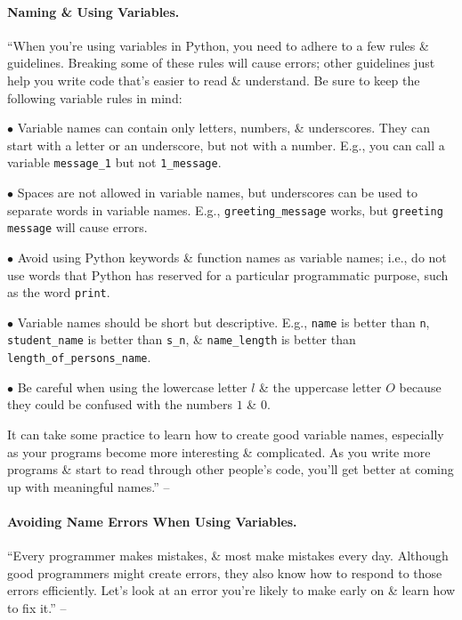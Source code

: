 \documentclass[oneside]{book}
\numberwithin{equation}{section}
\begin{document}
\paragraph{Naming \& Using Variables.} ``When you're using variables in Python, you need to adhere to a few rules \& guidelines. Breaking some of these rules will cause errors; other guidelines just help you write code that's easier to read \& understand. Be sure to keep the following variable rules in mind:
\begin{enumerate*}
	\item[$\bullet$] Variable names can contain only letters, numbers, \& underscores. They can start with a letter or an underscore, but not with a number. E.g., you can call a variable \verb|message_1| but not \verb|1_message|.
	\item[$\bullet$] Spaces are not allowed in variable names, but underscores can be used to separate words in variable names. E.g., \verb|greeting_message| works, but \texttt{greeting message} will cause errors.
	\item[$\bullet$] Avoid using Python keywords \& function names as variable names; i.e., do not use words that Python has reserved for a particular programmatic purpose, such as the word \texttt{print}.
	\item[$\bullet$] Variable names should be short but descriptive. E.g., \texttt{name} is better than \texttt{n}, \verb|student_name| is better than \verb|s_n|, \& \verb|name_length| is better than \verb|length_of_persons_name|.
	\item[$\bullet$] Be careful when using the lowercase letter $l$ \& the uppercase letter $O$ because they could be confused with the numbers $1$ \& $0$.
\end{enumerate*}

It can take some practice to learn how to create good variable names, especially as your programs become more interesting \& complicated. As you write more programs \& start to read through other people's code, you'll get better at coming up with meaningful names.'' -- \cite[p. 17]{Matthes2019}

\paragraph{Avoiding Name Errors When Using Variables.} ``Every programmer makes mistakes, \& most make mistakes every day. Although good programmers might create errors, they also know how to respond to those errors efficiently. Let's look at an error you're likely to make early on \& learn how to fix it.'' -- \cite[p. 17]{Matthes2019}
\end{document}
